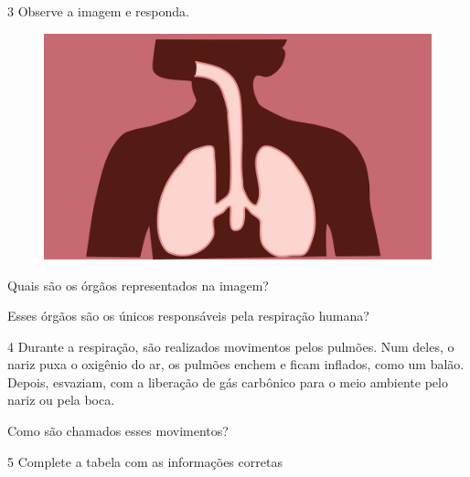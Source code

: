 \num{3} Observe a imagem e responda.

\begin{figure}[htpb!]
\includegraphics[width=.5\textwidth]{./imgs/img1.png}
\end{figure}

\begin{escolha}
\item Quais são os órgãos representados na imagem?


\item Esses órgãos são os únicos responsáveis pela respiração humana?

\end{escolha}

\num{4} Durante a respiração, são realizados movimentos pelos
pulmões. Num deles, o nariz puxa o oxigênio do ar, os pulmões enchem e
ficam inflados, como um balão. Depois, esvaziam, com a liberação de gás
carbônico para o meio ambiente pelo nariz ou pela boca.

Como são chamados esses movimentos?


\num{5} Complete a tabela com as informações corretas\medskip

